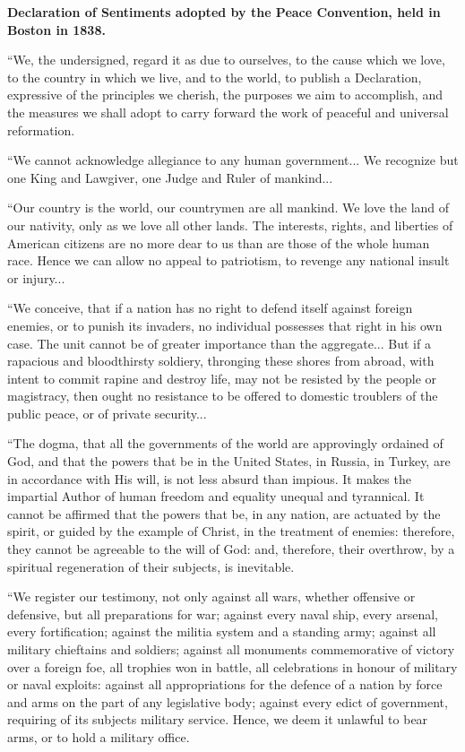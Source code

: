 \documentclass{book}
\begin{document}
\textbf{Declaration of Sentiments adopted by the Peace Convention, held in Boston in 1838.}

“We, the undersigned, regard it as due to ourselves, to the cause which we love, to the country in which we live, and to the world, to publish a Declaration, expressive of the principles we cherish, the purposes we aim to accomplish, and the measures we shall adopt to carry forward the work of peaceful and universal reformation.

“We cannot acknowledge allegiance to any human government... We recognize but one King and Lawgiver, one Judge and Ruler of mankind...

“Our country is the world, our countrymen are all mankind. We love the land of our nativity, only as we love all other lands. The interests, rights, and liberties of American citizens are no more dear to us than are those of the whole human race. Hence we can allow no appeal to patriotism, to revenge any national insult or injury...

“We conceive, that if a nation has no right to defend itself against foreign enemies, or to punish its invaders, no individual possesses that right in his own case. The unit cannot be of greater importance than the aggregate... But if a rapacious and bloodthirsty soldiery, thronging these shores from abroad, with intent to commit rapine and destroy life, may not be resisted by the people or magistracy, then ought no resistance to be offered to domestic troublers of the public peace, or of private security...

“The dogma, that all the governments of the world are approvingly ordained of God, and that the powers that be in the United States, in Russia, in Turkey, are in accordance with His will, is not less absurd than impious. It makes the impartial Author of human freedom and equality unequal and tyrannical. It cannot be affirmed that the powers that be, in any nation, are actuated by the spirit, or guided by the example of Christ, in the treatment of enemies: therefore, they cannot be agreeable to the will of God: and, therefore, their overthrow, by a spiritual regeneration of their subjects, is inevitable.

“We register our testimony, not only against all wars, whether offensive or defensive, but all preparations for war; against every naval ship, every arsenal, every fortification; against the militia system and a standing army; against all military chieftains and soldiers; against all monuments commemorative of victory over a foreign foe, all trophies won in battle, all celebrations in honour of military or naval exploits: against all appropriations for the defence of a nation by force and arms on the part of any legislative body; against every edict of government, requiring of its subjects military service. Hence, we deem it unlawful to bear arms, or to hold a military office.
\end{document}
